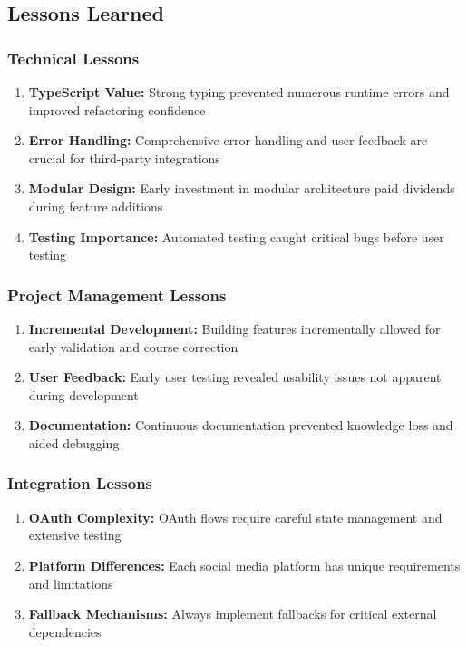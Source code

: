 \subsection{Lessons Learned}

\subsubsection{Technical Lessons}

\begin{enumerate}
    \item \textbf{TypeScript Value:} Strong typing prevented numerous runtime errors and improved refactoring confidence
    \item \textbf{Error Handling:} Comprehensive error handling and user feedback are crucial for third-party integrations
    \item \textbf{Modular Design:} Early investment in modular architecture paid dividends during feature additions
    \item \textbf{Testing Importance:} Automated testing caught critical bugs before user testing
\end{enumerate}

\subsubsection{Project Management Lessons}

\begin{enumerate}
    \item \textbf{Incremental Development:} Building features incrementally allowed for early validation and course correction
    \item \textbf{User Feedback:} Early user testing revealed usability issues not apparent during development
    \item \textbf{Documentation:} Continuous documentation prevented knowledge loss and aided debugging
\end{enumerate}

\subsubsection{Integration Lessons}

\begin{enumerate}
    \item \textbf{OAuth Complexity:} OAuth flows require careful state management and extensive testing
    \item \textbf{Platform Differences:} Each social media platform has unique requirements and limitations
    \item \textbf{Fallback Mechanisms:} Always implement fallbacks for critical external dependencies
\end{enumerate}

